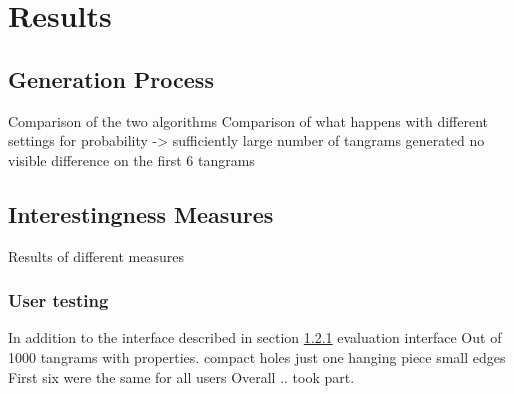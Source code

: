\chapter{Results}\label{chapter:results}

\section{Generation Process}

Comparison of the two algorithms
Comparison of what happens with different settings for probability -> sufficiently large number of tangrams generated no visible difference on the first 6 tangrams

\section{Interestingness Measures}

Results of different measures

\subsection{User testing}

In addition to the interface described in section \ref{} evaluation interface 
Out of 1000 tangrams
with properties. 
compact
holes
just one hanging piece
small edges
First six were the same for all users
Overall .. took part. 